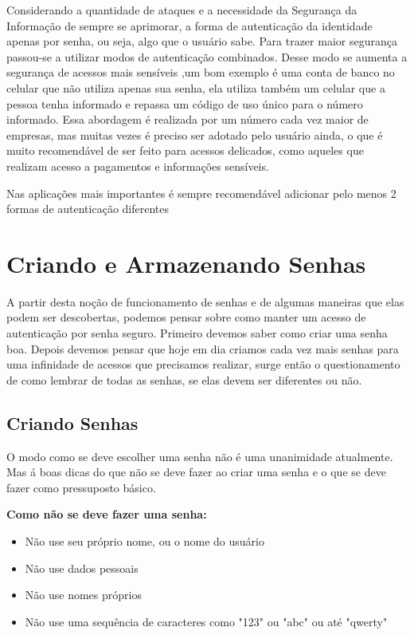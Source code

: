 Considerando a quantidade de ataques e a necessidade da Segurança da Informação de sempre se aprimorar, a forma de autenticação da identidade apenas por senha, ou seja, algo que o usuário sabe. Para trazer maior segurança passou-se a utilizar modos de autenticação combinados. Desse modo se aumenta a segurança de acessos mais sensíveis ,um bom exemplo é uma conta de banco no celular que não utiliza apenas sua senha, ela utiliza também um celular que a pessoa tenha informado e repassa um código de uso único para o número informado. Essa abordagem é realizada por um número cada vez maior de empresas, mas muitas vezes é preciso ser adotado pelo usuário ainda, o que é muito recomendável de ser feito para acessos delicados, como aqueles que realizam acesso a pagamentos e informações sensíveis.
\begin{ficadica}
    Nas aplicações mais importantes é sempre recomendável adicionar pelo menos 2 formas de autenticação diferentes
\end{ficadica}


\section{Criando e Armazenando Senhas}
A partir desta noção de funcionamento de senhas e de algumas maneiras que elas podem ser descobertas, podemos pensar sobre como manter um acesso de autenticação por senha seguro. Primeiro devemos saber como criar uma senha boa. Depois devemos pensar que hoje em dia criamos cada vez mais senhas para uma infinidade de acessos que precisamos realizar, surge então o questionamento de como lembrar de todas as senhas, se elas devem ser diferentes ou não.

\subsection{Criando Senhas}
O modo como se deve escolher uma senha não é uma unanimidade atualmente. Mas á boas dicas do que não se deve fazer ao criar uma senha e o que se deve fazer como pressuposto básico.

\begin{ficadica}
\textbf{Como não se deve fazer uma senha:}
\begin{itemize}
    \item Não use seu próprio nome, ou o nome do usuário
    \item Não use dados pessoais
    \item Não use nomes próprios
    \item Não use uma sequência de caracteres como "123" ou "abc" ou até "qwerty"
\end{itemize}
\end{ficadica}


